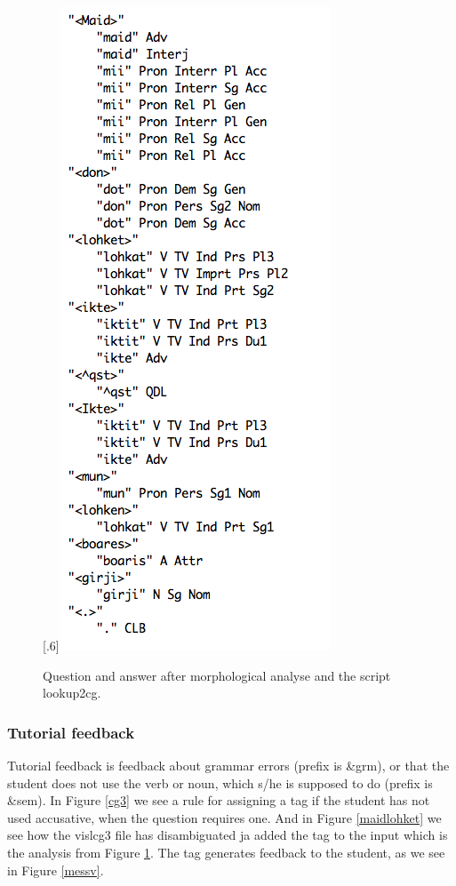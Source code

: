 \documentclass[a4paper,12pt]{article}
\begin{document}
\begin{figure}[htbp]
\begin{center}
\scalebox{.6}[.6]{\includegraphics{img/iktelohken.png}}
\caption{Question and answer after morphological analyse and the script lookup2cg.}
\label{iktelohken}
\end{center}
\end{figure}

\newpage
\subsubsection{Tutorial feedback}
Tutorial feedback is feedback about grammar errors (prefix is \&grm), or that the student does not use the verb or noun, which s/he is supposed to do (prefix is \&sem). In Figure \ref{cg3} we see a rule for assigning a tag if the student has not used accusative, when the question requires one. And in Figure \ref{maidlohket} we see how the vislcg3 file has disambiguated ja added the tag to the input which is the analysis from Figure \ref{iktelohken}. The tag generates feedback to the student, as we see in Figure \ref{messv}.
\end{document}
